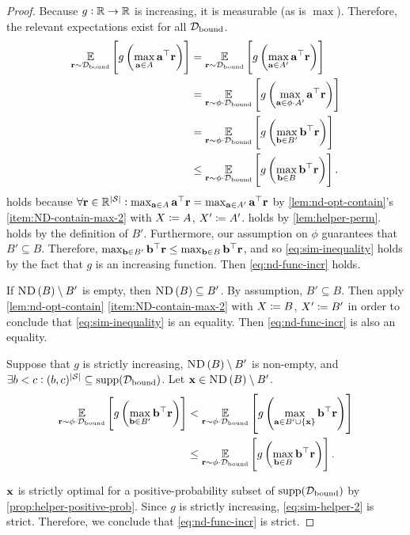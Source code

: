 \begin{proof}
Because $g:\mathbb{R}\to\mathbb{R}$ is increasing, it is measurable (as is $\max$). Therefore, the relevant expectations exist for all $\mathcal{D}_{\text{bound}}$.
\begin{align}
     \operatorname*{\mathbb{E}}_{\mathbf{r} \sim \mathcal{D}_{\text{bound}}}\left[g\left(\max_{\mathbf{a}\in A}\mathbf{a}^\top \mathbf{r}\right)\right] &=\operatorname*{\mathbb{E}}_{\mathbf{r} \sim \mathcal{D}_{\text{bound}}}\left[g\left(\max_{\mathbf{a}\in A'}\mathbf{a}^\top \mathbf{r}\right)\right]\label{eq:nd-func-incr-restr}\\
     &=\operatorname*{\mathbb{E}}_{\mathbf{r} \sim \phi\cdot \mathcal{D}_{\text{bound}}}\left[g\left(\max_{\mathbf{a}\in \phi\cdot A'}\mathbf{a}^\top \mathbf{r}\right)\right]\label{eq:apply-helper}\\
     &=\operatorname*{\mathbb{E}}_{\mathbf{r} \sim \phi\cdot \mathcal{D}_{\text{bound}}}\left[g\left(\max_{\mathbf{b}\in B'}\mathbf{b}^\top \mathbf{r}\right)\right]\label{eq:sim-helper}\\
     &\leq\operatorname*{\mathbb{E}}_{\mathbf{r} \sim \phi\cdot \mathcal{D}_{\text{bound}}}\left[g\left(\max_{\mathbf{b}\in B}\mathbf{b}^\top \mathbf{r}\right)\right].\label{eq:sim-inequality}
\end{align}
 holds because $\forall \mathbf{r}\in\mathbb{R}^{\left|\mathcal{S}\right|}:\max_{\mathbf{a}\in A}\mathbf{a}^\top \mathbf{r}=\max_{\mathbf{a}\in A'}\mathbf{a}^\top \mathbf{r}$ by \cref{lem:nd-opt-contain}'s \cref{item:ND-contain-max-2} with $X\coloneqq A$, $X'\coloneqq A'$.  holds by \cref{lem:helper-perm}.  holds by the definition of $B'$. Furthermore, our assumption on $\phi$ guarantees that $B'\subseteq B$. Therefore, $\max_{\mathbf{b}\in B'}\mathbf{b}^\top \mathbf{r}\leq \max_{\mathbf{b}\in B}\mathbf{b}^\top \mathbf{r}$, and so \cref{eq:sim-inequality} holds by the fact that $g$ is an increasing function. Then \cref{eq:nd-func-incr} holds. 

If $\text{\upshape\textsc{ND}}\left(B\right)\setminus B'$ is empty, then $\text{\upshape\textsc{ND}}\left(B\right)\subseteq B'$. By assumption, $B'\subseteq B$. Then apply \cref{lem:nd-opt-contain} \cref{item:ND-contain-max-2} with $X\coloneqq B$, $X'\coloneqq B'$ in order to conclude that \cref{eq:sim-inequality} is an equality. Then \cref{eq:nd-func-incr} is also an equality.

Suppose that $g$ is strictly increasing, $\text{\upshape\textsc{ND}}\left(B\right)\setminus B'$ is non-empty, and $\exists b<c: (b,c)^{\abs{\St}}\subseteq\supp[\Dbd]$. Let $\mathbf{x} \in \text{\upshape\textsc{ND}}\left(B\right)\setminus B'$.
\begin{align}
     \operatorname*{\mathbb{E}}_{\mathbf{r} \sim \phi\cdot \mathcal{D}_{\text{bound}}}\left[g\left(\max_{\mathbf{b}\in B'}\mathbf{b}^\top \mathbf{r}\right)\right]&< \operatorname*{\mathbb{E}}_{\mathbf{r} \sim \phi\cdot \mathcal{D}_{\text{bound}}}\left[g\left(\max_{\mathbf{a}\in B'\cup\left\{\mathbf{x}\right\}}\mathbf{b}^\top \mathbf{r}\right)\right]\label{eq:sim-helper-2}\\
     &\leq\operatorname*{\mathbb{E}}_{\mathbf{r} \sim \phi\cdot \mathcal{D}_{\text{bound}}}\left[g\left(\max_{\mathbf{b}\in B}\mathbf{b}^\top \mathbf{r}\right)\right].\label{eq:sim-inequality-2}
\end{align}

$\mathbf{x}$ is strictly optimal for a positive-probability subset of $\supp[\Dbd]$ by \cref{prop:helper-positive-prob}. Since  $g$ is strictly increasing, \cref{eq:sim-helper-2} is strict. Therefore, we conclude that \cref{eq:nd-func-incr} is strict.
\end{proof}

